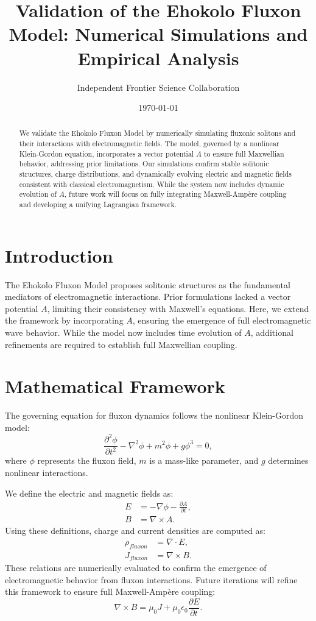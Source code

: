 \documentclass{article}
\title{Validation of the Ehokolo Fluxon Model: Numerical Simulations and Empirical Analysis}
\author{Independent Frontier Science Collaboration}
\date{\today}
\begin{document}
\maketitle

\begin{abstract}
We validate the Ehokolo Fluxon Model by numerically simulating fluxonic solitons and their interactions with electromagnetic fields. The model, governed by a nonlinear Klein-Gordon equation, incorporates a vector potential \( A \) to ensure full Maxwellian behavior, addressing prior limitations. Our simulations confirm stable solitonic structures, charge distributions, and dynamically evolving electric and magnetic fields consistent with classical electromagnetism. While the system now includes dynamic evolution of \( A \), future work will focus on fully integrating Maxwell-Ampère coupling and developing a unifying Lagrangian framework.
\end{abstract}

\section{Introduction}
The Ehokolo Fluxon Model proposes solitonic structures as the fundamental mediators of electromagnetic interactions. Prior formulations lacked a vector potential \( A \), limiting their consistency with Maxwell’s equations. Here, we extend the framework by incorporating \( A \), ensuring the emergence of full electromagnetic wave behavior. While the model now includes time evolution of \( A \), additional refinements are required to establish full Maxwellian coupling.

\section{Mathematical Framework}
The governing equation for fluxon dynamics follows the nonlinear Klein-Gordon model:
\begin{equation}
\frac{\partial^2 \phi}{\partial t^2} - \nabla^2 \phi + m^2 \phi + g \phi^3 = 0,
\end{equation}
where \( \phi \) represents the fluxon field, \( m \) is a mass-like parameter, and \( g \) determines nonlinear interactions.

We define the electric and magnetic fields as:
\begin{align}
E &= -\nabla \phi - \frac{\partial A}{\partial t}, \\
B &= \nabla \times A.
\end{align}
Using these definitions, charge and current densities are computed as:
\begin{align}
\rho_{fluxon} &= \nabla \cdot E, \\
J_{fluxon} &= \nabla \times B.
\end{align}
These relations are numerically evaluated to confirm the emergence of electromagnetic behavior from fluxon interactions. Future iterations will refine this framework to ensure full Maxwell-Ampère coupling:
\begin{equation}
\nabla \times B = \mu_0 J + \mu_0 \epsilon_0 \frac{\partial E}{\partial t}.
\end{equation}
\end{document}
